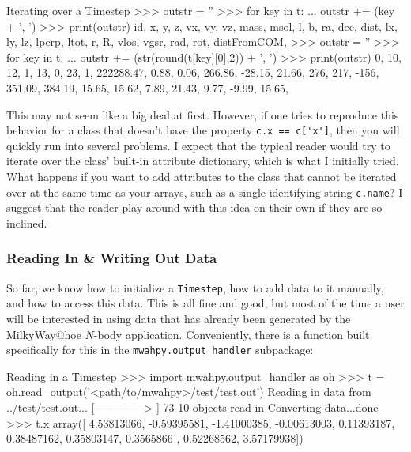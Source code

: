 \documentclass{article}
\begin{document}
\begin{codelisting}{Iterating over a Timestep}
>>> outstr = ''
>>> for key in t:
...     outstr += (key + ', ')
>>> print(outstr)
id, x, y, z, vx, vy, vz, mass, msol, l, b, ra, dec, dist, lx, ly, 
lz, lperp, ltot, r, R, vlos, vgsr, rad, rot, distFromCOM, 
>>> outstr = ''
>>> for key in t:
...	outstr += (str(round(t[key][0],2)) + ', ')
>>> print(outstr)
0, 10, 12, 1, 13, 0, 23, 1, 222288.47, 0.88, 0.06, 266.86, -28.15, 21.66, 
276, 217, -156, 351.09, 384.19, 15.65, 15.62, 7.89, 21.43, 9.77, -9.99,
15.65,
\end{codelisting}

This may not seem like a big deal at first. However, if one tries to reproduce this behavior for a class that doesn't have the property \verb!c.x == c['x']!, then you will quickly run into several problems. I expect that the typical reader would try to iterate over the class' built-in attribute dictionary, which is what I initially tried. What happens if you want to add attributes to the class that cannot be iterated over at the same time as your arrays, such as a single identifying string \verb!c.name!? I suggest that the reader play around with this idea on their own if they are so inclined. 

\subsubsection{Reading In \& Writing Out Data}

So far, we know how to initialize a \verb!Timestep!, how to add data to it manually, and how to access this data. This is all fine and good, but most of the time a user will be interested in using data that has already been generated by the MilkyWay@hoe $N$-body application. Conveniently, there is a \mwahpy function built specifically for this in the \verb!mwahpy.output_handler! subpackage: \\

\begin{codelisting}{Reading in a Timestep}
>>> import mwahpy.output_handler as oh
>>> t = oh.read_output('<path/to/mwahpy>/test/test.out')
Reading in data from ../test/test.out...
[-------------->     ] 73%
10 objects read in
Converting data...done
>>> t.x
array([ 4.53813066, -0.59395581, -1.41000385, -0.00613003,  0.11393187,
        0.38487162,  0.35803147,  0.3565866 ,  0.52268562, 3.57179938])
\end{codelisting}
\end{document}
